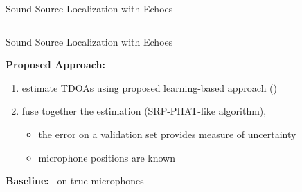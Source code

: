 \begin{frame}[t]{Sound Source Localization \alert{with Echoes} \hfill\faMapMarked*}
\begin{columns}[T,onlytextwidth]
    \end{columns}


\end{frame}

\begin{frame}{Sound Source Localization \alert{with Echoes} \hfill\faMapMarked*}

    \vspace*{2mm}
    \begin{mycontriblock}
        \textbf{Proposed Approach:}
        \begin{enumerate}
            \item estimate \alert{TDOAs} using proposed learning-based approach (\MLP)
            \item fuse together the estimation (SRP-PHAT-like algorithm\footnotemark[1]),
            \begin{itemize}
                \item the error on a validation set provides measure of uncertainty
                \item microphone positions are known
            \end{itemize}
        \end{enumerate}
    \end{mycontriblock}

    \pause
    \vspace{1mm}
    \begin{mysotablock}
        \textbf{Baseline:} \GCCPHAT~on true microphones\footnotemark[2]
    \end{mysotablock}

    \vspace{1mm}

\end{frame}

